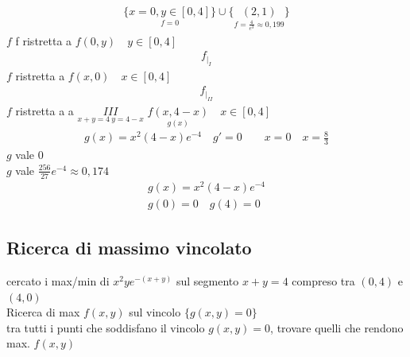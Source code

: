\documentclass[a4paper, oneside]{article}
\begin{document}
\begin{example}
\begin{center}
           \end{center}
           \begin{gather*}
                \{\underset{f = 0}{x = 0, y \in [0,4]}\} \cup \{\underset{f = \frac{4}{e^3} \approx 0,199}{(2,1)}\}
           \end{gather*}
           $f$ f ristretta a  $f(0,y) \quad y \in [0,4]$
           \begin{gather*}
            f_{|_I}
           \end{gather*} 
           $f$ ristretta a  $f(x,0) \quad x \in [0,4]$
           \begin{gather*}
            f_{|_{II}}
           \end{gather*}
           $f$ ristretta a a $\underset{x+y = 4 \ y = 4-x}{\boxed{III}}$ $\underset{g(x)}{f(x,4-x)} \quad x \in [0,4]$
           \begin{gather*}
            g(x) = x^2(4-x) e^{-4} \quad g'=0 \qquad x = 0 \quad x = \frac{8}{3}
           \end{gather*}
           $g$ vale $0$ \\
           $g$ vale $\frac{256}{27}e^{-4} \approx 0,174$
           \begin{gather*}
            g(x) = x^2(4-x)e^{-4}\\
            g(0) = 0 \quad g(4) = 0
           \end{gather*}
        \end{example}
        \subsection{Ricerca di massimo vincolato}
        cercato i max/min di $x^2y e^{-(x+y)}$ sul segmento $x+y=4$ compreso tra $(0,4 )$ e $(4,0)$\\
        Ricerca di max $f(x,y)$ sul vincolo $\{g(x,y) = 0\}$\\
        tra tutti i punti che soddisfano il vincolo $g(x,y) = 0$, trovare quelli che rendono max. $f(x,y)$
\end{document}
